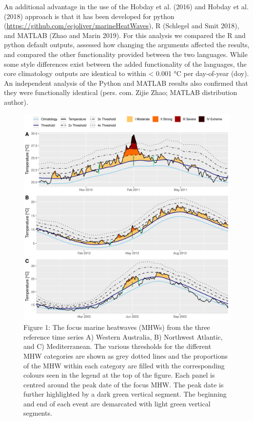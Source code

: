 \documentclass[utf8]{frontiersSCNS} %
\begin{document}
An additional advantage in the use of the Hobday et al. (2016) and
Hobday et al. (2018) approach is that it has been developed for python
(\url{https://github.com/ecjoliver/marineHeatWaves}), R (Schlegel and
Smit 2018), and MATLAB (Zhao and Marin 2019). For this analysis we
compared the R and python default outputs, assessed how changing the
arguments affected the results, and compared the other functionality
provided between the two languages. While some style differences exist
between the added functionality of the languages, the core climatology
outputs are identical to within \textless{} 0.001 °C per day-of-year
(doy). An independent analysis of the Python and MATLAB results also
confirmed that they were functionally identical (pers. com. Zijie Zhao;
MATLAB distribution author).

\begin{figure}
\centering
\includegraphics{../LaTeX/fig_1.png}
\caption{Figure 1: The focus marine heatwaves (MHWs) from the three
reference time series A) Western Australia, B) Northwest Atlantic, and
C) Mediterranean. The various thresholds for the different MHW
categories are shown as grey dotted lines and the proportions of the MHW
within each category are filled with the corresponding colours seen in
the legend at the top of the figure. Each panel is centred around the
peak date of the focus MHW. The peak date is further highlighted by a
dark green vertical segment. The beginning and end of each event are
demarcated with light green vertical segments.}
\end{figure}
\end{document}

